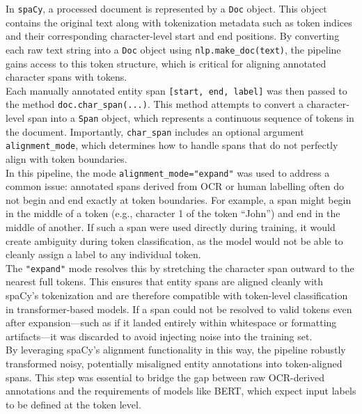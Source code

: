 \documentclass{article}
\begin{document}
In \texttt{spaCy}, a processed document is represented by a \texttt{Doc} object. This object contains the original text along with tokenization metadata such as token indices and their corresponding character-level start and end positions. By converting each raw text string into a \texttt{Doc} object using \texttt{nlp.make\_doc(text)}, the pipeline gains access to this token structure, which is critical for aligning annotated character spans with tokens. \\

Each manually annotated entity span \texttt{[start, end, label]} was then passed to the method \texttt{doc.char\_span(...)}. This method attempts to convert a character-level span into a \texttt{Span} object, which represents a continuous sequence of tokens in the document. Importantly, \texttt{char\_span} includes an optional argument \texttt{alignment\_mode}, which determines how to handle spans that do not perfectly align with token boundaries. \\

In this pipeline, the mode \texttt{alignment\_mode="expand"} was used to address a common issue: annotated spans derived from OCR or human labelling often do not begin and end exactly at token boundaries. For example, a span might begin in the middle of a token (e.g., character 1 of the token ``John'') and end in the middle of another. If such a span were used directly during training, it would create ambiguity during token classification, as the model would not be able to cleanly assign a label to any individual token. \\

The \texttt{"expand"} mode resolves this by stretching the character span outward to the nearest full tokens. This ensures that entity spans are aligned cleanly with spaCy’s tokenization and are therefore compatible with token-level classification in transformer-based models. If a span could not be resolved to valid tokens even after expansion—such as if it landed entirely within whitespace or formatting artifacts—it was discarded to avoid injecting noise into the training set. \\

By leveraging spaCy’s alignment functionality in this way, the pipeline robustly transformed noisy, potentially misaligned entity annotations into token-aligned spans. This step was essential to bridge the gap between raw OCR-derived annotations and the requirements of models like BERT, which expect input labels to be defined at the token level.
\end{document}
